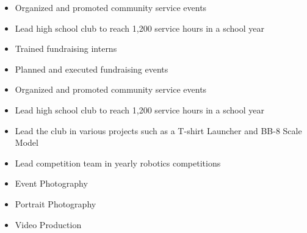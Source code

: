 

\begin{itemize}
\item Organized and promoted community service events 
\smallskip
\item Lead high school club to reach 1,200 service hours in a school year
\smallskip
\end{itemize}

\divider

\begin{itemize}
\item Trained fundraising interns
\smallskip
\item Planned and executed fundraising events
\smallskip
\end{itemize}

\divider

\begin{itemize}
\item Organized and promoted community service events 
\smallskip
\item Lead high school club to reach 1,200 service hours in a school year
\smallskip
\end{itemize}

\divider

\begin{itemize}
\item Lead the club in various projects such as a T-shirt Launcher and BB-8 Scale Model
\smallskip
\item Lead competition team in yearly robotics competitions
\smallskip
\end{itemize}

\begin{itemize}
\item{Event Photography}
\smallskip
\item{Portrait Photography}
\smallskip
\item{Video Production}
\smallskip
\end{itemize}
